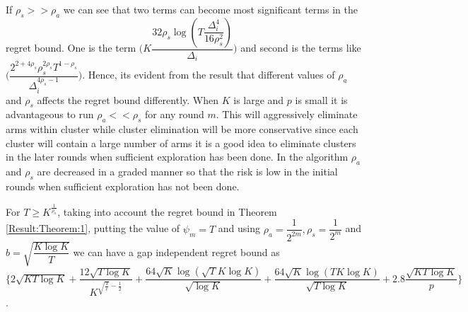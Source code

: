 \begin{remark}
	If $\rho_{s}>>\rho_{a}$ we can see that two terms can become most significant terms in the regret bound. One is the term  $\bigg(K\dfrac{32\rho_{s}\log{(T\dfrac{\Delta_{i}^{4}}{16\rho_{s}^{2}})}}{\Delta_{i}}\bigg)$ and second is the terms like $\bigg(\dfrac{2^{2+4\rho_{s}}\rho_{s}^{2\rho_{s}}T^{1-\rho_{s}}}{\Delta_{i}^{4\rho_{s}-1}}\bigg)$. Hence, its evident from the result that different values of $\rho_{a}$ and $\rho_{s}$ affects the regret bound differently. When $K$ is large and $p$ is small it is advantageous to run $\rho_{a} << \rho_{s}$ for any round $m$. This will aggressively eliminate arms within cluster while cluster elimination will be more conservative since each cluster will contain a large number of arms it is a good idea to eliminate clusters in the later rounds when sufficient exploration has been done. In the algorithm $\rho_{a}$ and $\rho_{s}$ are decreased in a graded manner so that the risk is low in the initial rounds when sufficient exploration has not been done.
\end{remark}

\begin{corollary}
For $T\geq K^{\frac{1}{\rho_{a}}}$, taking into account the regret bound in Theorem \ref{Result:Theorem:1}, putting the value of $\psi_{m}=T$ and using $\rho_{a}=\dfrac{1}{2^{2m}},\rho_{s}=\dfrac{1}{2^{m}} $ and $b=\sqrt{\dfrac{K\log K}{T}}$ we can have a gap independent regret bound as $\bigg\lbrace 2\sqrt{KT\log K} + \dfrac{12\sqrt{T\log K}}{K^{\sqrt{\frac{T}{e}}-\frac{1}{2}}} + \dfrac{64\sqrt{K}\log{(\sqrt{T}K\log K)}}{\sqrt{\log K}} + \dfrac{64\sqrt{K}\log{(TK\log K)}}{\sqrt{T\log K}} + 2.8\dfrac{\sqrt{KT\log K}}{p} \bigg\rbrace$.
\end{corollary}


